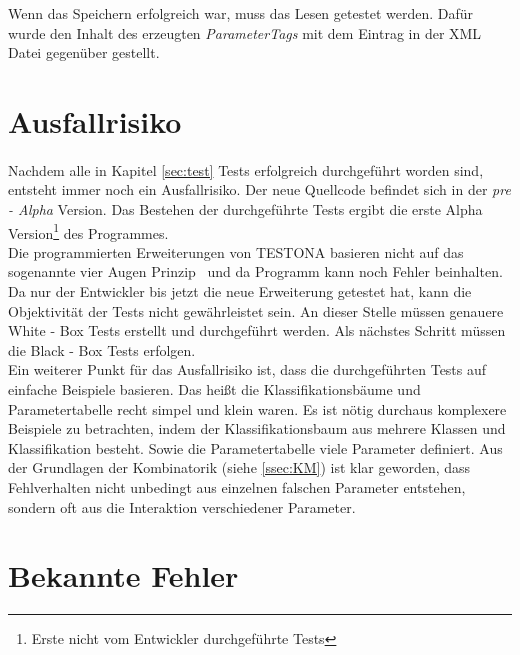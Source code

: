 Wenn das Speichern erfolgreich war, muss das Lesen getestet werden. Dafür wurde den Inhalt des erzeugten \textit{ParameterTags} mit dem Eintrag in der XML Datei gegenüber gestellt.



\newpage
\section{Ausfallrisiko}
\paragraph{}
Nachdem alle in Kapitel \ref{sec:test} Tests erfolgreich durchgeführt worden sind, entsteht immer noch ein Ausfallrisiko. Der neue Quellcode befindet sich in der \textit{pre - Alpha} Version. Das Bestehen der durchgeführte Tests ergibt die erste Alpha Version\footnote{Erste nicht vom Entwickler durchgeführte Tests} des Programmes.\\


Die programmierten Erweiterungen von TESTONA basieren nicht auf das sogenannte \glqq vier Augen Prinzip\grqq~ und da Programm kann noch Fehler beinhalten. Da nur der Entwickler bis jetzt die neue Erweiterung getestet hat, kann die Objektivität der Tests nicht gewährleistet sein. An dieser Stelle müssen genauere White - Box Tests erstellt und durchgeführt werden. Als nächstes Schritt müssen die Black - Box Tests erfolgen.\\


Ein weiterer Punkt für das Ausfallrisiko ist, dass die durchgeführten Tests auf einfache Beispiele basieren. Das heißt die Klassifikationsbäume und Parametertabelle recht simpel und klein waren. Es ist nötig durchaus komplexere Beispiele zu betrachten, indem der Klassifikationsbaum aus mehrere Klassen und Klassifikation besteht. Sowie die Parametertabelle viele Parameter definiert. Aus der Grundlagen der Kombinatorik (siehe \ref{ssec:KM}) ist klar geworden, dass Fehlverhalten nicht unbedingt aus einzelnen falschen Parameter entstehen, sondern oft aus die Interaktion verschiedener Parameter.


\newpage
\section{Bekannte Fehler}
